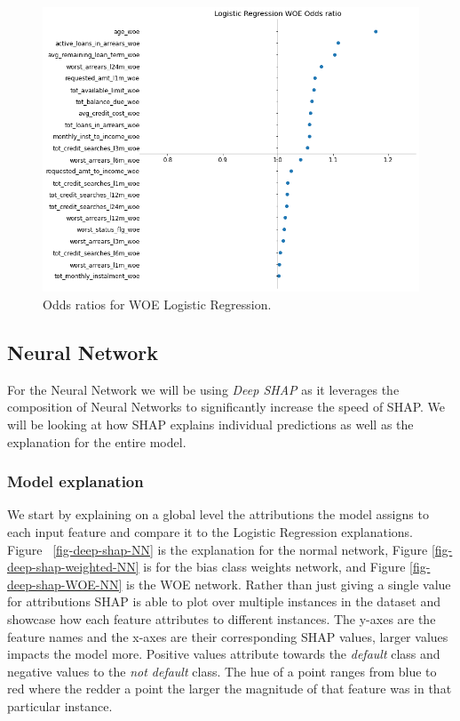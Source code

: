 \begin  {figure}[!htpb]
\centering
  \includegraphics[width=0.8\linewidth]{Credit_Images/LR_WOE_ODDS.png}
   \caption{Odds ratios for WOE Logistic Regression.}
    \label{fig-odds-woe}
\end{figure}


\subsection{Neural Network}
For the Neural Network we will be using \emph{Deep SHAP} as it leverages the composition of Neural Networks to significantly increase the speed of SHAP.
We will be looking at how SHAP explains individual predictions as well as the explanation for the entire model.
\subsubsection{Model explanation}
We start by explaining on a global level the attributions the model assigns to each input feature and compare it to the Logistic Regression explanations. Figure~ \ref{fig-deep-shap-NN} is the explanation for the normal network, Figure \ref{fig-deep-shap-weighted-NN} is for the bias class weights network, and Figure \ref{fig-deep-shap-WOE-NN} is the WOE network. Rather than just giving a single value for attributions SHAP is able to plot over multiple instances in the dataset and showcase how each feature attributes to different instances. The y-axes are the feature names and the x-axes are their corresponding SHAP values, larger values impacts the model more. Positive values attribute towards the \emph{default} class and negative values to the \emph{not default} class. The hue of a point ranges from blue to red where the redder a point the larger the magnitude of that feature was in that particular instance.
